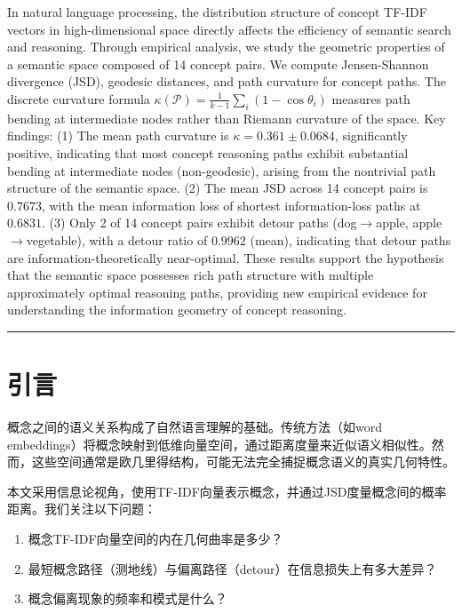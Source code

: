 \documentclass[UTF8,fontset=mac]{ctexart}
\begin{document}
In natural language processing, the distribution structure of concept TF-IDF vectors in high-dimensional space directly affects the efficiency of semantic search and reasoning. Through empirical analysis, we study the geometric properties of a semantic space composed of 14 concept pairs. We compute Jensen-Shannon divergence (JSD), geodesic distances, and path curvature for concept paths. The discrete curvature formula \(\kappa(\mathcal{P}) = \frac{1}{k-1}\sum_i(1-\cos\theta_i)\) measures path bending at intermediate nodes rather than Riemann curvature of the space. Key findings: (1) The mean path curvature is \(\kappa = 0.361 \pm 0.0684\), significantly positive, indicating that most concept reasoning paths exhibit substantial bending at intermediate nodes (non-geodesic), arising from the nontrivial path structure of the semantic space. (2) The mean JSD across 14 concept pairs is \(0.7673\), with the mean information loss of shortest information-loss paths at \(0.6831\). (3) Only 2 of 14 concept pairs exhibit detour paths (dog\(\to\)apple, apple\(\to\)vegetable), with a detour ratio of \(0.9962\) (mean), indicating that detour paths are information-theoretically near-optimal. These results support the hypothesis that the semantic space possesses rich path structure with multiple approximately optimal reasoning paths, providing new empirical evidence for understanding the information geometry of concept reasoning.

\begin{center}\rule{0.5\linewidth}{0.5pt}\end{center}

\section{引言}\label{introduction}

概念之间的语义关系构成了自然语言理解的基础。传统方法（如word embeddings）将概念映射到低维向量空间，通过距离度量来近似语义相似性。然而，这些空间通常是欧几里得结构，可能无法完全捕捉概念语义的真实几何特性。

本文采用信息论视角，使用TF-IDF向量表示概念，并通过JSD度量概念间的概率距离。我们关注以下问题：

\begin{enumerate}
\item
  概念TF-IDF向量空间的内在几何曲率是多少？
\item
  最短概念路径（测地线）与偏离路径（detour）在信息损失上有多大差异？
\item
  概念偏离现象的频率和模式是什么？
\end{enumerate}
\end{document}
